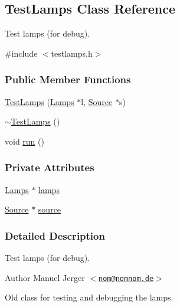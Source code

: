 \hypertarget{classTestLamps}{\subsection{\-Test\-Lamps \-Class \-Reference}
\label{classTestLamps}
}


\-Test lamps (for debug).  




{\ttfamily \#include $<$testlamps.\-h$>$}

\subsubsection*{\-Public \-Member \-Functions}
\begin{DoxyCompactItemize}
\item 
\hyperlink{classTestLamps_a6ed3021c087fc940bf43db82acdb1ca3}{\-Test\-Lamps} (\hyperlink{classLamps}{\-Lamps} $\ast$l, \hyperlink{classSource}{\-Source} $\ast$s)
\item 
\hyperlink{classTestLamps_a042a0150ca9f78d6143234eb93409336}{$\sim$\-Test\-Lamps} ()
\item 
void \hyperlink{classTestLamps_a1ff7e573b794b9b91dec88a9401e7ea5}{run} ()
\end{DoxyCompactItemize}
\subsubsection*{\-Private \-Attributes}
\begin{DoxyCompactItemize}
\item 
\hyperlink{classLamps}{\-Lamps} $\ast$ \hyperlink{classTestLamps_a09fec794f7adfa7e7e3f29dd74e03b2d}{lamps}
\item 
\hyperlink{classSource}{\-Source} $\ast$ \hyperlink{classTestLamps_ad48820948ab9c2ac12de569a65145d58}{source}
\end{DoxyCompactItemize}


\subsubsection{\-Detailed \-Description}
\-Test lamps (for debug). 

\begin{DoxyAuthor}{\-Author}
\-Manuel \-Jerger $<$\href{mailto:nom@nomnom.de}{\tt nom@nomnom.\-de}$>$
\end{DoxyAuthor}
\-Old class for testing and debugging the lamps. 

